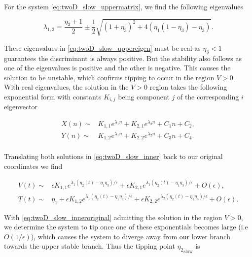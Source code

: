 For the system \eqref{eq:twoD_slow_uppermatrix}, we find the following eigenvalues

\begin{equation}\label{eq:twoD_slow_uppereigen}
\lambda_{1,2}=\frac{\eta_3+1}{2}\pm\frac{1}{2}\sqrt{(1+\eta_3)^2+4(\eta_1(1-\eta_3)-\eta_3)}.
\end{equation}

These eigenvalues in \eqref{eq:twoD_slow_uppereigen} must be real as $\eta_3<1$ guarantees the discriminant is always positive. But the stability also follows as one of the eigenvalues is positive and the other is negative. This causes the solution to be unstable, which confirms tipping to occur in the region $V>0$. With real eigenvalues, the solution in the $V>0$ region takes the following exponential form with constants $K_{i,j}$ being component $j$ of the corresponding $i$ eigenvector 

\begin{equation}\label{eq:twoD_slow_innersoln}
\begin{aligned}
X(n)\sim& K_{1,1}e^{\lambda_1 n}+K_{2,1}e^{\lambda_2 n}+C_1 n+C_2,\\
Y(n)\sim& K_{1,2}e^{\lambda_1 n}+K_{2,2}e^{\lambda_2 n}+C_3 n+C_4.\\
\end{aligned}
\end{equation}

Translating both solutions in \eqref{eq:twoD_slow_inner} back to our original coordinates we find

\begin{equation}\label{eq:twoD_slow_inneroriginal}
\begin{aligned}
V(t)\sim& \epsilon K_{1,1}e^{\lambda_1(\eta_2(t)-\eta_1\eta_3)/\epsilon}+\epsilon K_{2,1}e^{\lambda_1(\eta_2(t)-\eta_1\eta_3)/\epsilon}+O(\epsilon),\\
T(t)\sim& \eta_1+ \epsilon K_{1,2}e^{\lambda_1 (\eta_2(t)-\eta_1\eta_3)/\epsilon}+\epsilon K_{2,2}e^{\lambda_2 (\eta_2(t)-\eta_1\eta_3)/\epsilon}+O(\epsilon).
\end{aligned}
\end{equation}

With \eqref{eq:twoD_slow_inneroriginal} admitting the solution in the region $V>0$, we determine the system to tip once one of these exponentials becomes large (i.e $O(1/\epsilon)$), which causes the system to diverge away from our lower branch towards the upper stable branch. Thus the tipping point ${\eta_2}_{\text{slow}}$ is


